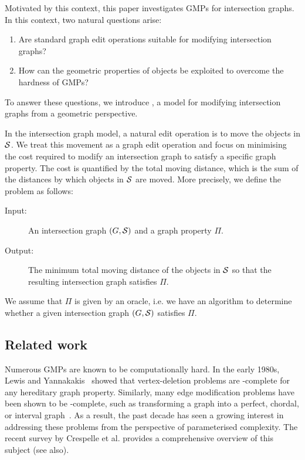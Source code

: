 Motivated by this context, this paper investigates GMPs for intersection graphs. In this context, two natural questions arise: \begin{enumerate} \item Are standard graph edit operations suitable for modifying intersection graphs? \item How can the geometric properties of objects be exploited to overcome the hardness of GMPs? \end{enumerate} To answer these questions, we introduce {\gged}, a model for modifying intersection graphs from a geometric perspective.

In the intersection graph model, a natural edit operation is to move the objects in $\S$. We treat this movement as a graph edit operation and focus on minimising the cost required to modify an intersection graph to satisfy a specific graph property. The cost is quantified by the total moving distance, which is the sum of the distances by which objects in $\S$ are moved. More precisely, we define the problem as follows:

\begin{itembox}[l]{{\gged}}\label{pro:uig_general} \begin{description} \item[Input:] An intersection graph $(G,\S)$ and a graph property $\Pi$. \item[Output:] The minimum total moving distance of the objects in $\S$ so that the resulting intersection graph satisfies $\Pi$. \end{description} \end{itembox}

We assume that $\Pi$ is given by an oracle, i.e. we have an algorithm to determine whether a given intersection graph $(G, \S)$ satisfies $\Pi$.

\subsection*{Related work}
Numerous GMPs are known to be computationally hard. In the early 1980s, Lewis and Yannakakis~\cite{Lewis1980} showed that vertex-deletion problems are \NP-complete for any hereditary graph property. Similarly, many edge modification problems have been shown to be \NP-complete, such as transforming a graph into a perfect, chordal, or interval graph~\cite{Burzyn2006}. As a result, the past decade has seen a growing interest in addressing these problems from the perspective of parameterised complexity. The recent survey by Crespelle et al.\cite{Crespelle2023} provides a comprehensive overview of this subject (see also\cite{Drange2015}).

